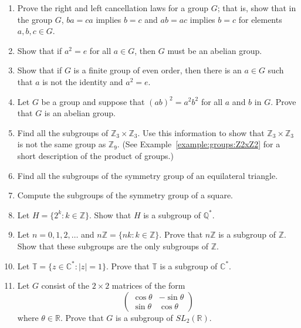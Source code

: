{\begin{enumerate}
 
\item
Prove the right and left cancellation laws for a group $G$; that is,
show that in the group $G$, $ba = ca$ implies $b = c$ and $ab = ac$
implies $b = c$ for elements $a, b, c \in G$.  
 
\item
Show that if $a^2 = e$ for all $a \in G$, then $G$ must be an abelian
group. 
 
 
\item
Show that if $G$ is a finite group of even order, then there is an $a
\in G$ such that $a$ is not the identity and $a^2 = e$.
 
 
\item
Let $G$ be a group and suppose that $(ab)^2 = a^2b^2$ for all $a$ and
$b$ in $G$.  Prove that $G$ is an abelian group. 
 
 
\item
Find all the subgroups of ${\mathbb Z}_3 \times {\mathbb Z}_3$. Use this
information to show that ${\mathbb Z}_3 \times {\mathbb Z}_3$ is not the
same group as ${\mathbb Z}_9$.  (See Example~\ref{example:groups:Z2xZ2}
for a short description of the product of groups.)
 
 
\item
Find all the subgroups of the symmetry group of an equilateral
triangle. 
 
 
\item
Compute the subgroups of the symmetry group of a square.
 
 
\item
Let $H = \{2^k : k \in {\mathbb Z} \}$. Show that $H$ is a subgroup of
${\mathbb Q}^*$. 
 
 
\item
Let $n = 0, 1, 2, \ldots$ and $n {\mathbb Z} = \{ nk : k \in  {\mathbb Z}
\}$. Prove that $n {\mathbb Z}$ is a subgroup of ${\mathbb Z}$.  Show that
these subgroups are the only subgroups of $\mathbb{Z}$.
 
 
\item
Let ${\mathbb T} = \{ z \in  {\mathbb C}^* : |z| =1 \}$. Prove that ${\mathbb
T}$ is a subgroup of ${\mathbb C}^*$. 
 
 
\item
Let $G$ consist of the $2 \times 2$ matrices of the form
\[
\begin{pmatrix}
\cos \theta & -\sin \theta \\
\sin \theta & \cos \theta
\end{pmatrix}
\]
where $\theta \in {\mathbb R}$. Prove that $G$ is a subgroup of $SL_2(
{\mathbb R})$. 
 

\end{enumerate}}
